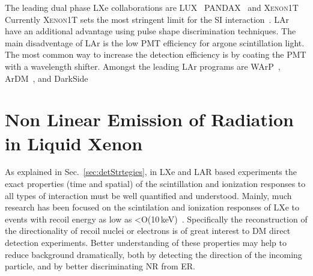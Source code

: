 The leading dual phase LXe collaborations are LUX~\cite{Akerib:2012ys} PANDAX~\cite{Cao:2014jsa} and \textsc{Xenon1T}~\cite{Aprile:2017aty} Currently \textsc{Xenon1T} sets the most stringent limit for the SI interaction~\cite{Xenon1TResults}. LAr have an additional advantage using  pulse shape discrimination techniques. The main disadventage of LAr is the low PMT efficiency for argone scintillation light. The most common way to increase the detection efficiency is by coating the PMT with a wavelength shifter. Amongst the leading LAr programs are WArP~\cite{Zani:2014lea}, ArDM~\cite{Rubbia:2005ge}, and DarkSide~\cite{Alexander:2013hia}  

\section{Non Linear Emission of Radiation in Liquid Xenon}
\label{sec:intro_superradiance}
As explained in Sec.~\ref{sec:detStrtegies}, in LXe and LAR based experiments the exact properties (time and spatial) of the scintillation and ionization responses to all types of interaction must be well quantified and understood. Mainly, much research has been focused on the scintilation and ionization responses of LXe to events with recoil energy as low as <O(10\,keV)~\cite{Manzur:2009hp,Aprile:2012an,Baudis:2013cca,Akerib:2016mzi}.
Specifically the reconstruction of the directionality of recoil nuclei or electrons is of great interest to DM direct detection experiments. Better understanding of these properties may help to reduce background dramatically, both by detecting the direction of the incoming particle, and by better discriminating NR from ER. 


